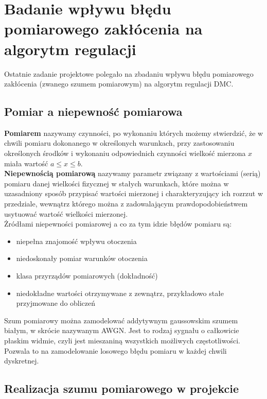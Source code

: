 \chapter{Badanie wpływu błędu pomiarowego zakłócenia na algorytm regulacji}
\label{zad7}

Ostatnie zadanie projektowe polegało na zbadaniu wpływu błędu pomiarowego 
zakłócenia (zwanego szumem pomiarowym) na algorytm regulacji DMC.

\section{Pomiar a niepewność pomiarowa}
\label{zad7_pomiar}
\textbf{Pomiarem} nazywamy czynności, po wykonaniu których możemy 
stwierdzić, że w chwili pomiaru dokonanego w określonych warunkach, 
przy zastosowaniu określonych środków i wykonaniu odpowiednich czynności 
wielkość mierzona $x$ miała wartość $a \leq x \leq b$.
\\

\textbf{Niepewnością pomiarową} nazywamy parametr związany z wartościami (serią) 
pomiaru danej wielkości fizycznej w stałych warunkach, które można w uzasadniony 
sposób przypisać wartości mierzonej i charakteryzujący ich rozrzut w przedziale, 
wewnątrz którego można z zadowalającym prawdopodobieństwem usytuować wartość 
wielkości mierzonej.\\

Żródłami niepewności pomiarowej a co za tym idzie błędów pomiaru są:
\begin{itemize}
    \item niepełna znajomość wpływu otoczenia
    \item niedoskonały pomiar warunków otoczenia 
    \item klasa przyrządów pomiarowych (dokładność) 
    \item niedokładne wartości otrzymywane z zewnątrz, przykładowo stałe przyjmowane do obliczeń
\end{itemize}

Szum pomiarowy można zamodelować addytywnym gaussowskim szumem białym, w skrócie nazywanym AWGN.
Jest to rodzaj sygnału o całkowicie płaskim widmie, czyli jest mieszaniną wszystkich możliwych
częstotliwości. Pozwala to na zamodelowanie losowego błędu pomiaru w każdej chwili dyskretnej.

\section{Realizacja szumu pomiarowego w projekcie}
\label{zad7_szum_w_matlabie}

